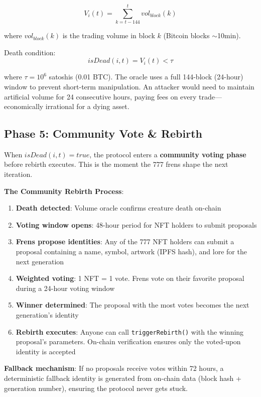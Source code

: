 \documentclass[11pt,a4paper]{article}
\begin{document}
\begin{equation}
V_i(t) = \sum_{k=t-144}^{t} vol_{block}(k)
\end{equation}

where $vol_{block}(k)$ is the trading volume in block $k$ (Bitcoin blocks $\sim$10min).

Death condition:
\begin{equation}
isDead(i, t) = V_i(t) < \tau
\end{equation}

where $\tau = 10^6$ satoshis (0.01 BTC). The oracle uses a full 144-block (24-hour) window to prevent short-term manipulation. An attacker would need to maintain artificial volume for 24 consecutive hours, paying fees on every trade---economically irrational for a dying asset.

\subsection{Phase 5: Community Vote \& Rebirth}

When $isDead(i, t) = true$, the protocol enters a \textbf{community voting phase} before rebirth executes. This is the moment the 777 frens shape the next iteration.

\textbf{The Community Rebirth Process}:

\begin{enumerate}
    \item \textbf{Death detected}: Volume oracle confirms creature death on-chain
    \item \textbf{Voting window opens}: 48-hour period for NFT holders to submit proposals
    \item \textbf{Frens propose identities}: Any of the 777 NFT holders can submit a proposal containing a name, symbol, artwork (IPFS hash), and lore for the next generation
    \item \textbf{Weighted voting}: 1 NFT = 1 vote. Frens vote on their favorite proposal during a 24-hour voting window
    \item \textbf{Winner determined}: The proposal with the most votes becomes the next generation's identity
    \item \textbf{Rebirth executes}: Anyone can call \texttt{triggerRebirth()} with the winning proposal's parameters. On-chain verification ensures only the voted-upon identity is accepted
\end{enumerate}

\textbf{Fallback mechanism}: If no proposals receive votes within 72 hours, a deterministic fallback identity is generated from on-chain data (block hash + generation number), ensuring the protocol never gets stuck.
\end{document}
